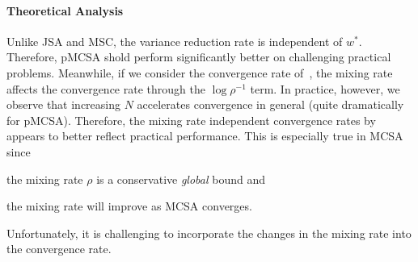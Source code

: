 

\vspace{-0.1in}
\paragraph{Theoretical Analysis}
Unlike JSA and MSC, the variance reduction rate is independent of \(w^*\).
Therefore, pMCSA shold perform significantly better on challenging practical problems.
Meanwhile, if we consider the convergence rate of~\citet{duchi_ergodic_2012}, the mixing rate affects the convergence rate through the \(\log \rho^{-1}\) term.
In practice, however, we observe that increasing \(N\) accelerates convergence in general (quite dramatically for pMCSA).
Therefore, the mixing rate independent convergence rates by~\citet{doan_finitetime_2020, doan_convergence_2020} appears to better reflect practical performance.
This is especially true in MCSA since
\begin{enumerate*}[label=\textbf{(\roman*)}]
  \item the mixing rate \(\rho\) is a conservative \textit{global} bound and 
  \item the mixing rate will improve as MCSA converges.
\end{enumerate*}
Unfortunately, it is challenging to incorporate the changes in the mixing rate into the convergence rate.


